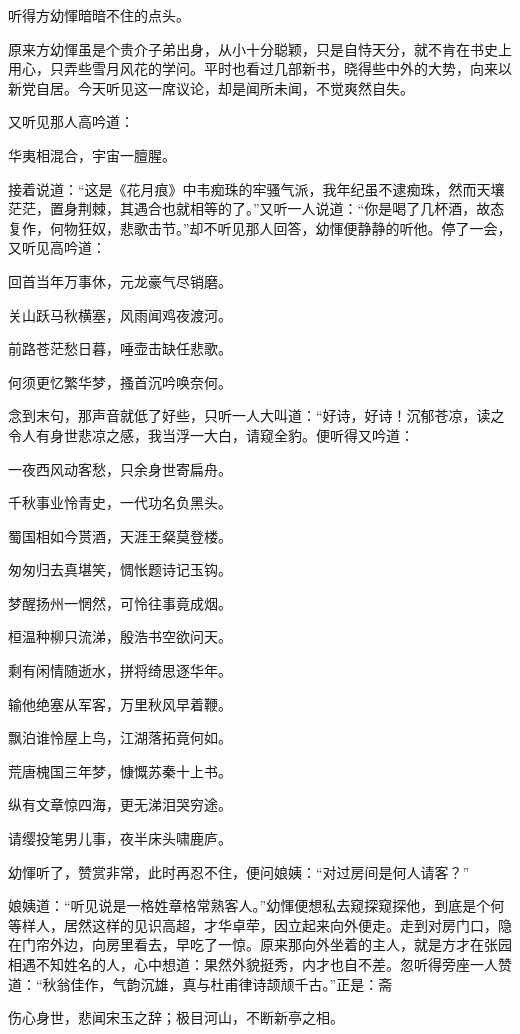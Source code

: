 \documentclass[12pt,UTF8]{ctexbook}
\begin{document}
{{{听得方幼惲暗暗不住的点头。

原来方幼惲虽是个贵介子弟出身，从小十分聪颖，只是自恃天分，就不肯在书史上用心，只弄些雪月风花的学问。平时也看过几部新书，晓得些中外的大势，向来以新党自居。今天听见这一席议论，却是闻所未闻，不觉爽然自失。

又听见那人高吟道：

华夷相混合，宇宙一膻腥。

接着说道：“这是《花月痕》中韦痴珠的牢骚气派，我年纪虽不逮痴珠，然而天壤茫茫，置身荆棘，其遇合也就相等的了。”又听一人说道：“你是喝了几杯酒，故态复作，何物狂奴，悲歌击节。”却不听见那人回答，幼惲便静静的听他。停了一会，又听见高吟道：

回首当年万事休，元龙豪气尽销磨。

关山跃马秋横塞，风雨闻鸡夜渡河。

前路苍茫愁日暮，唾壶击缺任悲歌。

何须更忆繁华梦，搔首沉吟唤奈何。

念到末句，那声音就低了好些，只听一人大叫道：“好诗，好诗！沉郁苍凉，读之令人有身世悲凉之感，我当浮一大白，请窥全豹。便听得又吟道：

一夜西风动客愁，只余身世寄扁舟。

千秋事业怜青史，一代功名负黑头。

蜀国相如今贳酒，天涯王粲莫登楼。

匆匆归去真堪笑，惆怅题诗记玉钩。

梦醒扬州一惘然，可怜往事竟成烟。

桓温种柳只流涕，殷浩书空欲问天。

剩有闲情随逝水，拼将绮思逐华年。

输他绝塞从军客，万里秋风早着鞭。

飘泊谁怜屋上鸟，江湖落拓竟何如。

荒唐槐国三年梦，慷慨苏秦十上书。

纵有文章惊四海，更无涕泪哭穷途。

请缨投笔男儿事，夜半床头啸鹿庐。

幼惲听了，赞赏非常，此时再忍不住，便问娘姨：“对过房间是何人请客？”

娘姨道：“听见说是一格姓章格常熟客人。”幼惲便想私去窥探窥探他，到底是个何等样人，居然这样的见识高超，才华卓荦，因立起来向外便走。走到对房门口，隐在门帘外边，向房里看去，早吃了一惊。原来那向外坐着的主人，就是方才在张园相遇不知姓名的人，心中想道：果然外貌挺秀，内才也自不差。忽听得旁座一人赞道：“秋翁佳作，气韵沉雄，真与杜甫律诗颉颃千古。”正是：斋

伤心身世，悲闻宋玉之辞；极目河山，不断新亭之相。

}}}
\end{document}
